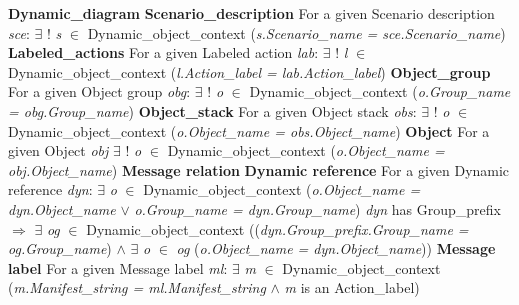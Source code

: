 \textbf{Dynamic\_diagram}\newline
\indent \textbf{Scenario\_description}\newline
\indent \indent For a given Scenario description \textit{sce}:\newline
\indent \indent \indent $\exists$ ! \textit{s} $\in$ Dynamic\_object\_context (\textit{s.Scenario\_name = sce.Scenario\_name})\newline
\indent \indent \textbf{Labeled\_actions}\newline
\indent \indent \indent For a given Labeled action \textit{lab}:\newline
\indent \indent \indent \indent $\exists$ ! \textit{l} $\in$ Dynamic\_object\_context (\textit{l.Action\_label = lab.Action\_label})\newline
\indent \textbf{Object\_group}\newline
\indent \indent For a given Object group \textit{obg}:\newline
\indent \indent \indent $\exists$ ! \textit{o} $\in$ Dynamic\_object\_context (\textit{o.Group\_name = obg.Group\_name})\newline
\indent \textbf{Object\_stack}\newline
\indent \indent For a given Object stack \textit{obs}:\newline
\indent \indent $\exists$ ! \textit{o} $\in$ Dynamic\_object\_context (\textit{o.Object\_name = obs.Object\_name})\newline
\indent \textbf{Object}\newline
\indent \indent For a given Object \textit{obj}\newline
\indent \indent \indent $\exists$ ! \textit{o} $\in$ Dynamic\_object\_context (\textit{o.Object\_name = obj.Object\_name})\newline
\textbf{Message relation}\newline
\indent \textbf{Dynamic reference}\newline
\indent \indent For a given Dynamic reference \textit{dyn}:\newline
\indent \indent \indent $\exists$ \textit{o} $\in$ Dynamic\_object\_context (\textit{o.Object\_name = dyn.Object\_name} $\vee$ \textit{o.Group\_name = dyn.Group\_name})\newline
\indent \indent \indent \textit{dyn} has Group\_prefix $\Rightarrow$ $\exists$ \textit{og} $\in$ Dynamic\_object\_context ((\textit{dyn.Group\_prefix.Group\_name = \newline
\indent \indent \indent og.Group\_name}) $\wedge$ $\exists$ \textit{o} $\in$ \textit{og} (\textit{o.Object\_name = dyn.Object\_name}))\newline
\indent \textbf{Message label}\newline
\indent \indent For a given Message label \textit{ml}:\newline
\indent \indent $\exists$ \textit{m} $\in$ Dynamic\_object\_context (\textit{m.Manifest\_string =  ml.Manifest\_string} $\wedge$ \textit{m} is an Action\_label)\newline